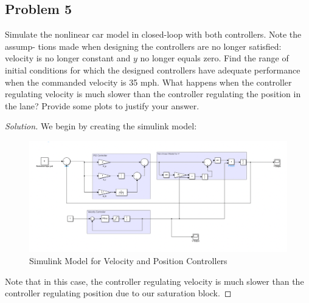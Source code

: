 \documentclass{article}
\begin{document}
\newpage
\subsection*{Problem 5}
Simulate the nonlinear car model in closed-loop with both controllers. Note the assump-
tions made when designing the controllers are no longer satisfied: velocity is no longer
constant and $y$ no longer equals zero. Find the range of initial conditions for which
the designed controllers have adequate performance when the commanded velocity is 35
mph. What happens when the controller regulating velocity is much slower than the
controller regulating the position in the lane? Provide some plots to justify your answer.

\begin{proof}[Solution]
We begin by creating the simulink model:
\begin{figure}[h!]
    \includegraphics[width=\linewidth]{q5model.png}
    \caption{Simulink Model for Velocity and Position Controllers}
\end{figure}

Note that in this case, the controller regulating velocity is much slower than the controller regulating position due to our saturation block. 


\end{proof}
\end{document}
